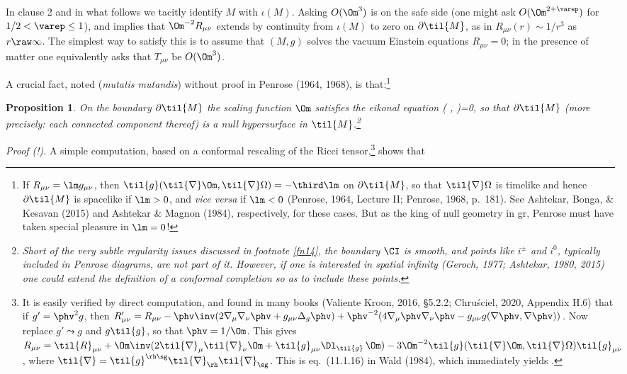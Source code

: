 \documentclass[12pt]{article}
\newcommand{\n}{\nabla}
\newcommand{\p}{\partial}
\newcommand{\GR}{{\sc gr}}
\newtheorem{proposition}[theorem]{Proposition}
\begin{document}
In clause 2 and in what follows we tacitly identify $M$ with  $\iota(M)$. Asking $O(\Om^3)$  is
 on the safe side (one might ask $O(\Om^{2+\varep})$ for $1/2<\varep\leq 1$), and implies that $\Om^{-2} R_{\mu\nu}$ extends  by continuity from $\iota(M)$ to zero on $\p\til{M}$, as in $R_{\mu\nu}(r)\sim 1/r^3$ as $r\raw\infty$.
The simplest way to satisfy this  is to assume that $(M,g)$ solves the vacuum Einstein equations $R_{\mu\nu}=0$; in the presence of matter one equivalently asks that $T_{\mu\nu}$ be $O(\Om^3)$. 
 
 A crucial fact, noted (\emph{mutatis mutandis}) 
 without proof in Penrose (1964, 1968), is that:\footnote{If $R_{\mu\nu}=\lm g_{\mu\nu}$, then $\til{g}(\til{\nabla} \Om, \til{\nabla}\Omega)=-\third \lm$ on $\p\til{M}$, so that $\til{\nabla}\Omega$ is timelike and hence  $\p\til{M}$ is spacelike if $\lm>0$,  and \emph{vice versa} if $\lm<0$ (Penrose, 1964, Lecture II; Penrose, 1968, p.\ 181). See  Ashtekar,  Bonga, \& Kesavan (2015) and  Ashtekar \&  Magnon (1984), respectively, for these cases.
 But as the king of null geometry in \GR, Penrose must have taken special pleasure in $\lm=0$!
 }
 \begin{proposition}\label{Omeikonal}
On the boundary $\p\til{M}$ the scaling function $\Om$ satisfies the eikonal equation 
\beq
{}(\til{\nabla} \Om, \til{\nabla}\Omega)=0, \label{eikonaleq}
\eeq
so that $\p\til{M}$ (more precisely: each connected component thereof) is a null hypersurface in $\til{M}$.\footnote{ Short of the very subtle regularity issues discussed in footnote \ref{fn14},
 the boundary $\CI$ is smooth, and points like $i^{\pm}$ and $i^0$, typically included in Penrose diagrams, are \emph{not} part of it. However,  if one is interested in \emph{spatial} infinity (Geroch, 1977; Ashtekar, 1980, 2015) one could extend the definition of a conformal completion so as to include these points. } 
\end{proposition}
\emph{Proof (!)}. A simple computation, based on a conformal rescaling of the Ricci tensor,\footnote{It is easily verified by direct computation, and found in many books (Valiente Kroon, 2016, \S 5.2.2; Chru\'{s}ciel, 2020, Appendix H.6)
 that if $g'=\phv^2 g$, then $R'_{\mu\nu}=R_{\mu\nu}-\phv\inv(2\n_{\mu}\n_{\nu}\phv +g_{\mu\nu}\Delta_g \phv)+\phv^{-2}(4\n_{\mu}\phv \n_{\nu}\phv-
g_{\mu\nu}g(\n\phv,\n\phv))$.
 Now replace $g'\leadsto g$ and $g\leadsto\til{g}$, so that $\phv=1/\Om$. This gives 
$R_{\mu\nu}=\til{R}_{\mu\nu}+\Om\inv(2\til{\n}_{\mu}\til{\n}_{\nu}\Om+ \til{g}_{\mu\nu}\Dl_{\til{g}}\,\Om)-3\Om^{-2}\til{g}(\til{\nabla} \Om, \til{\nabla}\Omega)\til{g}_{\mu\nu}$, where  $\til{\nabla} = \til{g}^{\rh\sg}\til{\nabla}_{\rh}\til{\nabla}_{\sg}$. This is eq.\ (11.1.16) in Wald (1984), which immediately yields .} shows that
\end{document}
